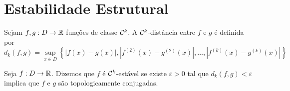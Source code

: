 \section{Estabilidade Estrutural}

\begin{definition}
Sejam $f, g: D \to \mathbb{R}$ funções de classe $\mathcal{C}^k$. A $\mathcal{C}^k$-distância entre $f$ e $g$ é definida por
$$d_k(f, g) = \sup_{x \in D} \left \{ |f(x) - g(x)|, |f^{(2)}(x) - g^{(2)}(x)|, \dots, |f^{(k)}(x) - g^{(k)}(x)| \right \}$$
\end{definition}

\begin{definition}
Seja $f: D \to \mathbb{R}$. Dizemos que $f$ é $\mathcal{C}^k$-estável se existe $\varepsilon > 0$ tal que $d_k(f, g) < \varepsilon$ implica que $f$ e $g$ são topologicamente conjugadas.
\end{definition}

